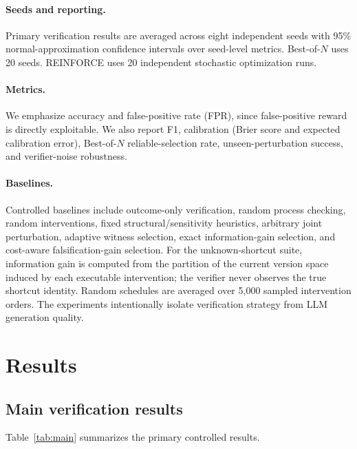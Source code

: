 \documentclass[10pt]{article}
\begin{document}
\paragraph{Seeds and reporting.}
Primary verification results are averaged across eight independent seeds with 95\% normal-approximation confidence intervals over seed-level metrics. Best-of-$N$ uses 20 seeds. REINFORCE uses 20 independent stochastic optimization runs.

\paragraph{Metrics.}
We emphasize accuracy and false-positive rate (FPR), since false-positive reward is directly exploitable. We also report F1, calibration (Brier score and expected calibration error), Best-of-$N$ reliable-selection rate, unseen-perturbation success, and verifier-noise robustness.

\paragraph{Baselines.}
Controlled baselines include outcome-only verification, random process checking, random interventions, fixed structural/sensitivity heuristics, arbitrary joint perturbation, adaptive witness selection, exact information-gain selection, and cost-aware falsification-gain selection. For the unknown-shortcut suite, information gain is computed from the partition of the current version space induced by each executable intervention; the verifier never observes the true shortcut identity. Random schedules are averaged over 5,000 sampled intervention orders. The experiments intentionally isolate verification strategy from LLM generation quality.

\section{Results}

\subsection{Main verification results}

Table~\ref{tab:main} summarizes the primary controlled results.
\end{document}
